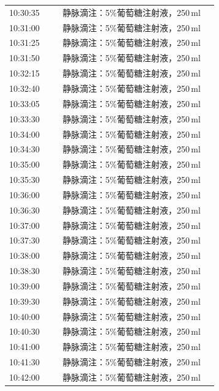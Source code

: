 \documentclass[UTF8,10pt,a4paper,fontset=fandol]{ctexart}
\begin{document}
\begin{minipage}[t]{0.47\linewidth}
\begin{tabular}{@{}p{0.24\linewidth}p{0.70\linewidth}@{}}
10:30:35 & 静脉滴注：5\%葡萄糖注射液，250\,ml\\
10:31:00 & 静脉滴注：5\%葡萄糖注射液，250\,ml\\
10:31:25 & 静脉滴注：5\%葡萄糖注射液，250\,ml\\
10:31:50 & 静脉滴注：5\%葡萄糖注射液，250\,ml\\
10:32:15 & 静脉滴注：5\%葡萄糖注射液，250\,ml\\
10:32:40 & 静脉滴注：5\%葡萄糖注射液，250\,ml\\
10:33:05 & 静脉滴注：5\%葡萄糖注射液，250\,ml\\
10:33:30 & 静脉滴注：5\%葡萄糖注射液，250\,ml\\
10:34:00 & 静脉滴注：5\%葡萄糖注射液，250\,ml\\
10:34:30 & 静脉滴注：5\%葡萄糖注射液，250\,ml\\
10:35:00 & 静脉滴注：5\%葡萄糖注射液，250\,ml\\
10:35:30 & 静脉滴注：5\%葡萄糖注射液，250\,ml\\
10:36:00 & 静脉滴注：5\%葡萄糖注射液，250\,ml\\
10:36:30 & 静脉滴注：5\%葡萄糖注射液，250\,ml\\
10:37:00 & 静脉滴注：5\%葡萄糖注射液，250\,ml\\
10:37:30 & 静脉滴注：5\%葡萄糖注射液，250\,ml\\
10:38:00 & 静脉滴注：5\%葡萄糖注射液，250\,ml\\
10:38:30 & 静脉滴注：5\%葡萄糖注射液，250\,ml\\
10:39:00 & 静脉滴注：5\%葡萄糖注射液，250\,ml\\
10:39:30 & 静脉滴注：5\%葡萄糖注射液，250\,ml\\
10:40:00 & 静脉滴注：5\%葡萄糖注射液，250\,ml\\
10:40:30 & 静脉滴注：5\%葡萄糖注射液，250\,ml\\
10:41:00 & 静脉滴注：5\%葡萄糖注射液，250\,ml\\
10:41:30 & 静脉滴注：5\%葡萄糖注射液，250\,ml\\
10:42:00 & 静脉滴注：5\%葡萄糖注射液，250\,ml\\
\end{tabular}
\end{minipage}
\hfill
\end{document}
